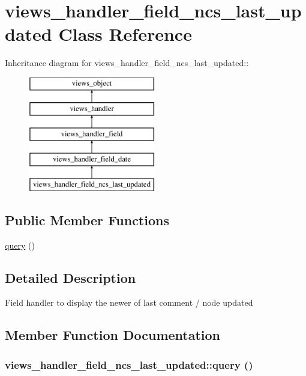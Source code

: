 \hypertarget{classviews__handler__field__ncs__last__updated}{
\section{views\_\-handler\_\-field\_\-ncs\_\-last\_\-updated Class Reference}
\label{classviews__handler__field__ncs__last__updated}
}
Inheritance diagram for views\_\-handler\_\-field\_\-ncs\_\-last\_\-updated::\begin{figure}[H]
\begin{center}
\leavevmode
\includegraphics[height=5cm]{classviews__handler__field__ncs__last__updated}
\end{center}
\end{figure}
\subsection*{Public Member Functions}
\begin{CompactItemize}
\item 
\hyperlink{classviews__handler__field__ncs__last__updated_9fdf82c20960c14abf4aaa37c578b299}{query} ()
\end{CompactItemize}


\subsection{Detailed Description}
Field handler to display the newer of last comment / node updated 

\subsection{Member Function Documentation}
\hypertarget{classviews__handler__field__ncs__last__updated_9fdf82c20960c14abf4aaa37c578b299}{
\subsubsection[{query}]{\setlength{\rightskip}{0pt plus 5cm}views\_\-handler\_\-field\_\-ncs\_\-last\_\-updated::query ()}}
\label{classviews__handler__field__ncs__last__updated_9fdf82c20960c14abf4aaa37c578b299}


